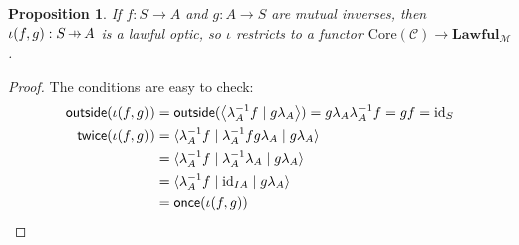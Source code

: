 \documentclass[11pt,letterpaper]{article}
\theoremstyle{plain}
\newtheorem{proposition}[theorem]{Proposition}
\theoremstyle{definition}
\newcommand{\C}{\mathscr{C}}
\newcommand{\M}{\mathscr{M}}
\newcommand{\Lawful}{\mathbf{Lawful}}
\newcommand{\id}{\mathrm{id}}
\newcommand{\rep}[2]{{\ensuremath \left\langle #1 \mid #2 \right\rangle}}
\newcommand{\repthree}[3]{{\ensuremath \langle #1 \mid #2 \mid #3 \rangle}}
\newcommand{\outside}{\mathsf{outside}}
\newcommand{\once}{\mathsf{once}}
\newcommand{\twice}{\mathsf{twice}}
\newcommand{\hto}{\ensuremath{\,\mathaccent\shortmid\rightarrow\,}}
\begin{document}
\begin{proposition}
  If $f : S \to A$ and $g : A \to S$ are mutual inverses, then $\iota(f, g) : S \hto A$ is a lawful optic, so $\iota$ restricts to a functor $\mathrm{Core}(\C) \to \Lawful_\M$.
\end{proposition}
\begin{proof}
The conditions are easy to check:
\begin{align*}
\outside(\iota(f, g)) &= \outside(\rep{\lambda_A^{-1} f}{g \lambda_{A}}) = g \lambda_{A} \lambda_A^{-1} f = g f = \id_S \\
\twice(\iota(f, g)) 
&= \repthree{\lambda_A^{-1} f}{\lambda_A^{-1} f g \lambda_{A}}{g \lambda_{A}} \\
&= \repthree{\lambda_A^{-1} f}{\lambda_A^{-1} \lambda_{A}}{g \lambda_{A}} \\ 
&= \repthree{\lambda_A^{-1} f}{\id_{IA}}{g \lambda_{A}} \\ 
&= \once(\iota(f, g))
\end{align*}
\end{proof}
\end{document}
